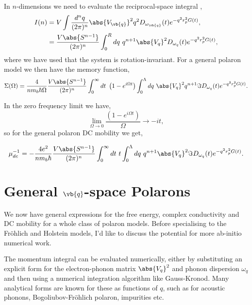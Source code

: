 In $n$-dimensions we need to evaluate the reciprocal-space integral ,
\begin{equation}
    \begin{aligned}
        I(n) &= V \int \frac{d^n q}{(2\pi)^n} \abs{V_{\vb{q}}}^2 q^2 D_{\omega_{\vb{q}}}(t) e^{-q^2 r_p^2 G(t)}, \\
        &= \frac{V \abs{S^{n-1}}}{(2\pi)^n} \int_0^R dq\ q^{n+1} \abs{V_{q}}^2 D_{\omega_{q}}(t) e^{-q^2 r_p^2 G(t)} ,
    \end{aligned}
\end{equation}
where we have used that the system is rotation-invariant. For a general polaron model we then have the memory function,
\begin{equation}
    \Sigma(\Omega) = \frac{4}{n m_b\hbar\Omega} \frac{V \abs{S^{n-1}}}{(2\pi)^n} \int_0^\infty dt\ \left(1 - e^{i \Omega t}\right) \int_0^\Lambda dq\ \abs{V_{q}}^2 q^{n+1} \Im{D_{\omega_q}(t) e^{-q^2 r_p^2 G(t)}}.
\end{equation}

In the zero frequency limit we have,
\begin{equation}
    \lim_{\Omega \to 0} \frac{\left(1 - e^{i \Omega t}\right)}{\Omega} \to -i t,
\end{equation}
so for the general polaron DC mobility we get,

\begin{equation}
    \mu_{dc}^{-1} = -\frac{4 e^2}{n m_b \hbar} \frac{V \abs{S^{n-1}}}{(2\pi)^n} \int_0^\infty dt\ t \int_0^\Lambda dq\ q^{n+1} \abs{V_{q}}^2 \Im{ D_{\omega_{q}}(t) e^{-q^2 r_p^2 G(t)}} .
\end{equation}

\section{General $\vb{q}$-space Polarons}

We now have general expressions for the free energy, complex conductivity and DC mobility for a whole class of polaron models. Before specialising to the Fr\"ohlich and Holstein models, I'd like to discuss the potential for more ab-initio numerical work. 
\newline

The momentum integral can be evaluated numerically, either by substituting an explicit form for the electron-phonon matrix $\abs{V_q}^2$ and phonon dispersion $\omega_q$ and then using a numerical integration algorithm like Gauss-Kronod. Many analytical forms are known for these as functions of $q$, such as for acoustic phonons, Bogoliubov-Fröhlich polaron, impurities etc.
\newline 

